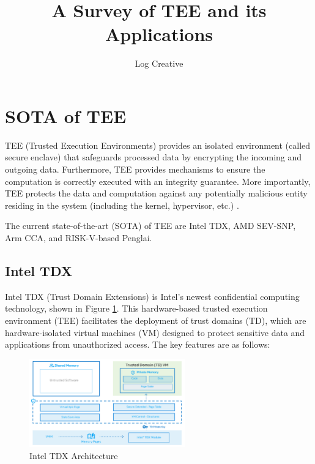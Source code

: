 \documentclass[lang=en]{sjtuarticle}
\title{A Survey of TEE and its Applications}
\author{Log Creative}
\begin{document}
\maketitle

\tableofcontents*

\section{SOTA of TEE}

TEE (Trusted Execution Environments) provides an isolated environment (called secure enclave) that safeguards processed data by
encrypting the incoming and outgoing data. Furthermore, TEE provides mechanisms to ensure the
computation is correctly executed with an integrity guarantee. More importantly, TEE protects the
data and computation against any potentially malicious entity residing in the system (including the
kernel, hypervisor, etc.) \cite{li2023survey}.

The current state-of-the-art (SOTA) of TEE are Intel TDX, AMD SEV-SNP, Arm CCA, and RISK-V-based Penglai.

\subsection{Intel TDX}

Intel TDX (Trust Domain Extensions) \cite{tdx} is Intel's newest confidential computing technology, shown in Figure \ref{fig:tdx}. This hardware-based trusted execution environment (TEE) facilitates the deployment of trust domains (TD), which are hardware-isolated virtual machines (VM) designed to protect sensitive data and applications from unauthorized access. The key features are as follows:

\begin{figure}[h]
    \centering
    \includegraphics[width=0.6\textwidth]{tdx.png}
    \caption{Intel TDX Architecture}
    \label{fig:tdx}
\end{figure}
\end{document}
